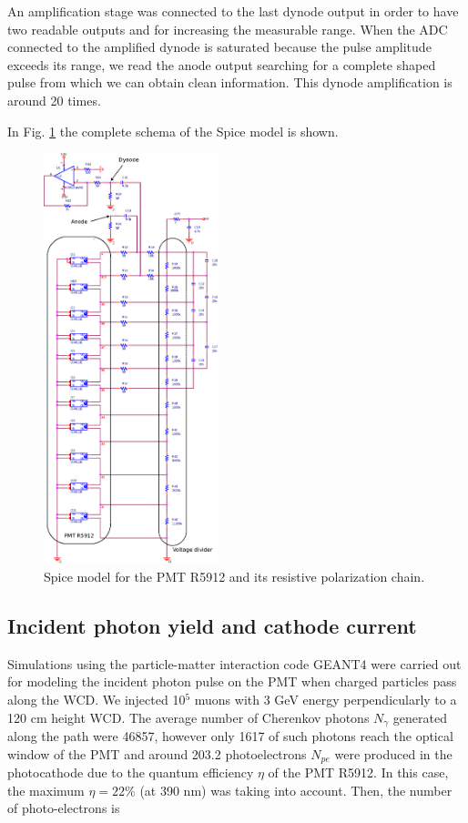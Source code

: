 \documentclass[letterpaper, 10 pt, conference]{ieeeconf}  %
\begin{document}
An amplification stage was connected to the last dynode output in order to have two readable outputs and for increasing the measurable range. When the ADC connected to the amplified dynode is saturated because the pulse amplitude exceeds its range, we read the anode output searching for a complete shaped pulse from which we can obtain clean information. This dynode amplification is around 20 times.

In Fig. \ref{Circuit} the complete schema of the Spice model is shown.


\begin{figure}[h!]
\begin{center}
\includegraphics[width=0.45\textwidth]{Figures/Circuit}
\caption{Spice model for the PMT R5912 and its resistive polarization chain.}
\label{Circuit}
\end{center}
\end{figure}






\subsection{Incident photon yield and cathode current}

Simulations using the particle-matter interaction code GEANT4 were carried out for modeling the incident photon pulse on the PMT when charged particles pass along the WCD. We injected 10$^5$ muons with 3 GeV energy perpendicularly to a 120 cm height WCD. The average number of Cherenkov photons $N_{\gamma}$ generated along the path were 46857, however only 1617 of such photons reach the optical window of the PMT and around 203.2 photoelectrons $N_{pe}$ were produced in the photocathode due to the quantum efficiency $\eta$ of the PMT R5912. In this case, the maximum $\eta = 22 \%$ (at 390 nm) was taking into account. Then, the number of photo-electrons is
\end{document}
